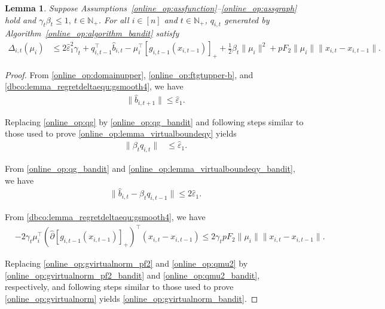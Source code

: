 \documentclass[12pt,draftcls,onecolumn]{IEEEtran}%
\newtheorem{lemma}{Lemma}
\begin{document}
\begin{lemma}\label{online_op:lemma_virtualbound_bandit}
Suppose Assumptions~\ref{online_op:assfunction}--\ref{online_op:assgraph} hold and $\gamma_{t}\beta_{t}\le1,~t\in\mathbb{N}_+$. For all $i\in[n]$ and $t\in\mathbb{N}_+$, $q_{i,t}$ generated by Algorithm~\ref{online_op:algorithm_bandit} satisfy
\begin{align}
\Delta_{i,t}(\mu_i)&\le 2\hat{\varepsilon}_{1}^2\gamma_t
+q_{i,t-1}^\top \hat{b}_{i,t}-\mu_i^\top[g_{i,t-1}(x_{i,t-1})]_+ 
+\frac{1}{2}\beta_t\|\mu_i\|^2+pF_2\|\mu_i\|\|x_{i,t}-x_{i,t-1}\|.
\label{online_op:gvirtualnorm_bandit}
\end{align}
\end{lemma}
\begin{proof}
From \eqref{online_op:domainupper}, \eqref{online_op:ftgtupper-b}, and \eqref{dbco:lemma_regretdeltaequ:gsmooth4}, we have
\begin{align}
\|\hat{b}_{i,t+1}\|\le \hat{\varepsilon}_{1}.\label{online_op:qg_bandit}
\end{align}

Replacing \eqref{online_op:qg} by \eqref{online_op:qg_bandit} and  following steps similar to those used to prove \eqref{online_op:lemma_virtualboundeqy} yields
\begin{align}
\|\beta_tq_{i,t}\|&\le \hat{\varepsilon}_{1}.\label{online_op:lemma_virtualboundeqy_bandit}
\end{align}

From \eqref{online_op:qg_bandit} and \eqref{online_op:lemma_virtualboundeqy_bandit}, we have
\begin{align}\label{online_op:gvirtualnorm_pf2_bandit}
\|\hat{b}_{i,t}-\beta_tq_{i,t-1}\|\le 2\hat{\varepsilon}_{1}.
\end{align}

From \eqref{dbco:lemma_regretdeltaequ:gsmooth4}, we have
\begin{align}
&-2\gamma_t\mu_i^\top(\hat{\partial} [g_{i,t-1}(x_{i,t-1})]_+)^\top(x_{i,t}-x_{i,t-1})
\le2\gamma_tpF_2\|\mu_i\|\|x_{i,t}-x_{i,t-1}\|.\label{online_op:qmu2_bandit}
\end{align}

Replacing \eqref{online_op:gvirtualnorm_pf2} and \eqref{online_op:qmu2} by \eqref{online_op:gvirtualnorm_pf2_bandit} and \eqref{online_op:qmu2_bandit}, respectively, and following steps similar to those used to prove \eqref{online_op:gvirtualnorm} yields \eqref{online_op:gvirtualnorm_bandit}.
\end{proof}
\end{document}
